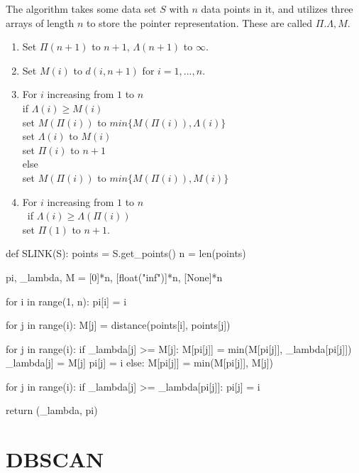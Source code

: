 The algorithm takes some data set $S$ with $n$ data points in it, and
utilizes three arrays of length $n$ to store the pointer representation.
These are called $\Pi. \Lambda, M$.

\begin{enumerate}
    \item Set $\Pi(n+1)$ to $n+1$, $\Lambda(n+1)$ to $\infty$.
    \item Set $M(i)$ to $d(i, n+1)$ for $i=1,...,n$.
    \item For $i$ increasing from $1$ to $n$ \\
        if $\Lambda(i) \geq M(i)$ \\
            set $M(\Pi(i))$ to $ min\{M(\Pi(i)), \Lambda(i)\}$ \\
            set $\Lambda(i)$ to $M(i)$ \\
            set $\Pi(i)$ to $n+1$ \\
        else \\
            set $M(\Pi(i))$ to $ min\{M(\Pi(i)), M(i)\}$ 
    \item For $i$ increasing from $1$ to $n$ \\\
        if $\Lambda(i) \geq \Lambda(\Pi(i))$ \\
            set $\Pi(1)$ to $n+1$.
\end{enumerate}

\begin{python}
def SLINK(S):
    points  = S.get_points()
    n       = len(points)
    
    pi, _lambda, M = [0]*n, [float("inf")]*n, [None]*n
    
    for i in range(1, n):
        pi[i] = i
        
        for j in range(i):
            M[j] = distance(points[i], points[j])
        
        for j in range(i):
            if _lambda[j] >= M[j]:
                M[pi[j]] = min(M[pi[j]], _lambda[pi[j]])
                _lambda[j] = M[j]
                pi[j] = i
            else:
                M[pi[j]] = min(M[pi[j]], M[j])
        
        for j in range(i):
            if _lambda[j] >= _lambda[pi[j]]:
                pi[j] = i
        
    return (_lambda, pi)
\end{python}

\newpage

\section{DBSCAN}

